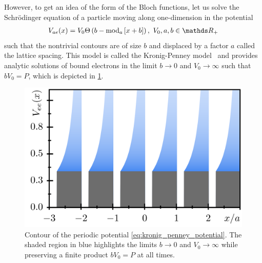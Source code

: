 However, to get an idea of the form of the Bloch functions, let us solve the Schrödinger equation of a particle moving along one-dimension in the potential
\begin{align}
    V_{ae}(x) = V_0 \Theta\brlr{b-{\rm mod}_{a}\commutator{x+b}},\ V_0,a,b\in\mathds R_+
    \label{eq:kronig_penney_potential}
\end{align}
such that the nontrivial contours are of size $b$ and displaced by a factor $a$ called the lattice spacing.
This model is called the Kronig-Penney model~\cite{KronigPenney1931} and provides analytic solutions of bound electrons in the limit $b\rightarrow0$ and $V_0\rightarrow\infty$ such that $bV_0=P$, which is depicted in \cref{fig:kronig_penney_potential}.
\begin{figure}
    \centering
    \includegraphics{figures/kronig_penney_potential.png}
    \caption{Contour of the periodic potential \cref{eq:kronig_penney_potential}. The shaded region in blue highlights the limits $b\rightarrow0$ and $V_0\rightarrow\infty$ while preserving a finite product $bV_0=P$ at all times.}
    \label{fig:kronig_penney_potential}
\end{figure}

